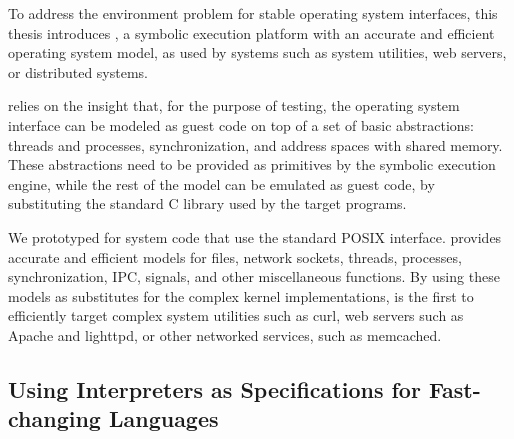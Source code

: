 
To address the environment problem for stable operating system interfaces, this thesis introduces \cnine, a symbolic execution platform with an accurate and efficient operating system model, as used by systems such as system utilities, web servers, or distributed systems.



\cnine relies on the insight that, for the purpose of testing, the operating system interface can be modeled as guest code on top of a set of basic abstractions: threads and processes, synchronization, and address spaces with shared memory.
%
These abstractions need to be provided as primitives by the symbolic execution engine, while the rest of the model can be emulated as guest code, by substituting the standard C library used by the target programs.



We prototyped \cnine for system code that use the standard POSIX interface.  \cnine provides accurate and efficient models for files, network sockets, threads, processes, synchronization, IPC, signals, and other miscellaneous functions.
%
By using these models as substitutes for the complex kernel implementations, \cnine is the first to efficiently target complex system utilities such as \textsf{curl}, web servers such as Apache and lighttpd, or other networked services, such as memcached.


\subsection{Using Interpreters as Specifications for Fast-changing Languages}

